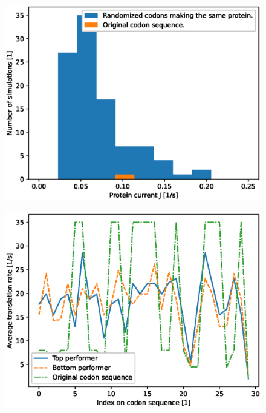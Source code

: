 \documentclass{article}
\begin{document}
\begin{figure}[H]
	\centering
	\includegraphics[width=\linewidth]{figs/task4_histogram_labversion_v0.eps}
	\label{fig:task4_histogram}
\end{figure}

\begin{figure}[H]
	\centering
	\includegraphics[width=\linewidth]{figs/task4_rateplot_labversion_v0.eps}
	\label{fig:task4_rateplot}
\end{figure}
\end{document}
